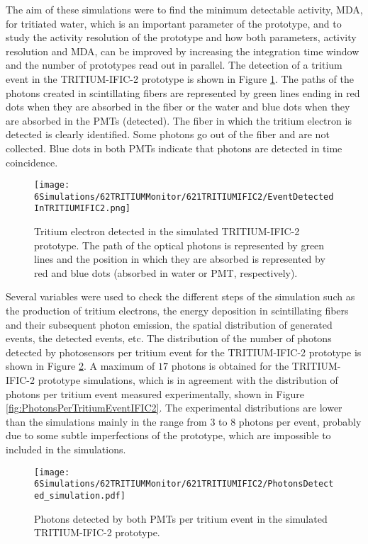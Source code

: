 The aim of these simulations were to find the minimum detectable activity, MDA, for tritiated water, which is an important parameter of the prototype, and to study the activity resolution of the prototype and how both parameters, activity resolution and MDA, can be improved by increasing the integration time window and the number of prototypes read out in parallel. The detection of a tritium event in the TRITIUM-IFIC-2 prototype is shown in Figure \ref{fig:TritiumEventDetectedInSimulatedPrototype}. The paths of the photons created in scintillating fibers are represented by green lines ending in red dots when they are absorbed in the fiber or the water and blue dots when they are absorbed in the PMTs (detected). The fiber in which the tritium electron is detected is clearly identified. Some photons go out of the fiber and are not collected. Blue dots in both PMTs indicate that photons are detected in time coincidence.

\begin{figure}[hbtp]
\centering
\texttt{[image: 6Simulations/62TRITIUMMonitor/621TRITIUMIFIC2/EventDetectedInTRITIUMIFIC2.png]}
\caption{Tritium electron detected in the simulated TRITIUM-IFIC-2 prototype. The path of the optical photons is represented by green lines and the position in which they are absorbed is represented by red and blue dots (absorbed in water or PMT, respectively).\label{fig:TritiumEventDetectedInSimulatedPrototype}}
\end{figure}

Several variables were used to check the different steps of the simulation such as the production of tritium electrons, the energy deposition in scintillating fibers and their subsequent photon emission, the spatial distribution of generated events, the detected events, etc. The distribution of the number of photons detected by photosensors per tritium event for the TRITIUM-IFIC-2 prototype is shown in Figure \ref{fig:SimulatedPhotonsDetected}. A maximum of $17$ photons is obtained for the TRITIUM-IFIC-2 prototype simulations, which is in agreement with the distribution of photons per tritium event measured experimentally, shown in Figure \ref{fig:PhotonsPerTritiumEventIFIC2}. The experimental distributions are lower than the simulations mainly in the range from $3$ to $8$ photons per event, probably due to some subtle imperfections of the prototype, which are impossible to included in the simulations.

\begin{figure}[hbtp]
\centering
\texttt{[image: 6Simulations/62TRITIUMMonitor/621TRITIUMIFIC2/PhotonsDetected\_simulation.pdf]}
\caption{Photons detected by both PMTs per tritium event in the simulated TRITIUM-IFIC-2 prototype.\label{fig:SimulatedPhotonsDetected}}
\end{figure}

